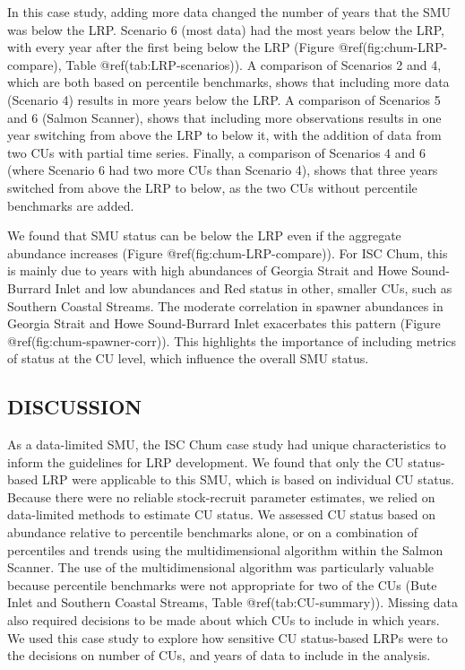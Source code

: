 \documentclass[
]{article}
\begin{document}
In this case study, adding more data changed the number of years that
the SMU was below the LRP. Scenario 6 (most data) had the most years
below the LRP, with every year after the first being below the LRP
(Figure @ref(fig:chum-LRP-compare), Table @ref(tab:LRP-scenarios)). A
comparison of Scenarios 2 and 4, which are both based on percentile
benchmarks, shows that including more data (Scenario 4) results in more
years below the LRP. A comparison of Scenarios 5 and 6 (Salmon Scanner),
shows that including more observations results in one year switching
from above the LRP to below it, with the addition of data from two CUs
with partial time series. Finally, a comparison of Scenarios 4 and 6
(where Scenario 6 had two more CUs than Scenario 4), shows that three
years switched from above the LRP to below, as the two CUs without
percentile benchmarks are added.

We found that SMU status can be below the LRP even if the aggregate
abundance increases (Figure @ref(fig:chum-LRP-compare)). For ISC Chum,
this is mainly due to years with high abundances of Georgia Strait and
Howe Sound-Burrard Inlet and low abundances and Red status in other,
smaller CUs, such as Southern Coastal Streams. The moderate correlation
in spawner abundances in Georgia Strait and Howe Sound-Burrard Inlet
exacerbates this pattern (Figure @ref(fig:chum-spawner-corr)). This
highlights the importance of including metrics of status at the CU
level, which influence the overall SMU status.

\hypertarget{discussion}{%
\subsection{DISCUSSION}\label{discussion}}

As a data-limited SMU, the ISC Chum case study had unique
characteristics to inform the guidelines for LRP development. We found
that only the CU status-based LRP were applicable to this SMU, which is
based on individual CU status. Because there were no reliable
stock-recruit parameter estimates, we relied on data-limited methods to
estimate CU status. We assessed CU status based on abundance relative to
percentile benchmarks alone, or on a combination of percentiles and
trends using the multidimensional algorithm within the Salmon Scanner.
The use of the multidimensional algorithm was particularly valuable
because percentile benchmarks were not appropriate for two of the CUs
(Bute Inlet and Southern Coastal Streams, Table @ref(tab:CU-summary)).
Missing data also required decisions to be made about which CUs to
include in which years. We used this case study to explore how sensitive
CU status-based LRPs were to the decisions on number of CUs, and years
of data to include in the analysis.
\end{document}
